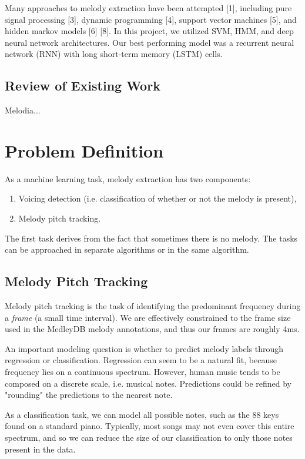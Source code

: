 \documentclass{article} %
\begin{document}
Many approaches to melody extraction have been attempted [1], including pure signal processing [3], dynamic programming [4], support vector machines [5], and hidden markov models [6] [8].  In this project, we utilized SVM, HMM, and deep neural network architectures.  Our best performing model was a recurrent neural network (RNN) with long short-term memory (LSTM) cells.

\subsection{Review of Existing Work}

Melodia...

\section{Problem Definition}
As a machine learning task, melody extraction has two components:

\begin{enumerate}
\item Voicing detection (i.e. classification of whether or not the melody is present),
\item Melody pitch tracking.
\end{enumerate}

The first task derives from the fact that sometimes there is no melody.  The tasks can be approached in separate algorithms or in the same algorithm.

\subsection{Melody Pitch Tracking}
Melody pitch tracking is the task of identifying the predominant frequency during a \textit{frame} (a small time interval).  We are effectively constrained to the frame size used in the MedleyDB melody annotations, and thus our frames are roughly 4ms.

An important modeling question is whether to predict melody labels through regression or classification.  Regression can seem to be a natural fit, because frequency lies on a continuous spectrum.  However, human music tends to be composed on a discrete scale, i.e. musical notes.  Predictions could be refined by "rounding" the predictions to the nearest note.

As a classification task, we can model all possible notes, such as the 88 keys found on a standard piano.  Typically, most songs may not even cover this entire spectrum, and so we can reduce the size of our classification to only those notes present in the data.
\end{document}
